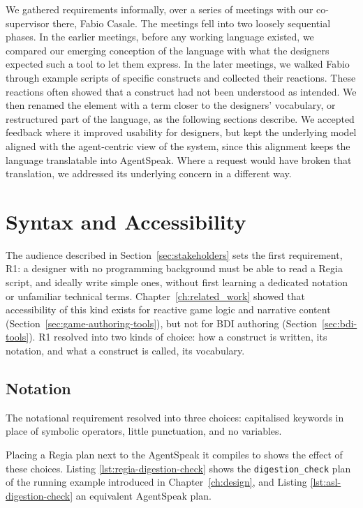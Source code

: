 We gathered requirements informally, over a series of meetings with our co-supervisor there, Fabio Casale. The meetings fell into two loosely sequential phases. In the earlier meetings, before any working language existed, we compared our emerging conception of the language with what the designers expected such a tool to let them express. In the later meetings, we walked Fabio through example scripts of specific constructs and collected their reactions. These reactions often showed that a construct had not been understood as intended. We then renamed the element with a term closer to the designers' vocabulary, or restructured part of the language, as the following sections describe. We accepted feedback where it improved usability for designers, but kept the underlying model aligned with the agent-centric view of the system, since this alignment keeps the language translatable into AgentSpeak. Where a request would have broken that translation, we addressed its underlying concern in a different way.

\section{Syntax and Accessibility}
\label{sec:syntax-accessibility}

The audience described in Section~\ref{sec:stakeholders} sets the first requirement, R1: a designer with no programming background must be able to read a Regia script, and ideally write simple ones, without first learning a dedicated notation or unfamiliar technical terms. Chapter~\ref{ch:related_work} showed that accessibility of this kind exists for reactive game logic and narrative content (Section~\ref{sec:game-authoring-tools}), but not for BDI authoring (Section~\ref{sec:bdi-tools}). R1 resolved into two kinds of choice: how a construct is written, its notation, and what a construct is called, its vocabulary.

\subsection{Notation}
The notational requirement resolved into three choices: capitalised keywords in place of symbolic operators, little punctuation, and no variables.

Placing a Regia plan next to the AgentSpeak it compiles to shows the effect of these choices. Listing  \ref{lst:regia-digestion-check} shows the \lstinline|digestion_check| plan of the running example introduced in Chapter~\ref{ch:design}, and Listing \ref{lst:asl-digestion-check} an equivalent AgentSpeak plan.

